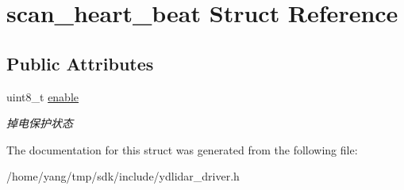 \hypertarget{structscan__heart__beat}{}\section{scan\+\_\+heart\+\_\+beat Struct Reference}
\label{structscan__heart__beat}
\subsection*{Public Attributes}
\begin{DoxyCompactItemize}
\item 
uint8\+\_\+t \hyperlink{structscan__heart__beat_a2b75f0058448601c590dda44d962d5c9}{enable}\hypertarget{structscan__heart__beat_a2b75f0058448601c590dda44d962d5c9}{}\label{structscan__heart__beat_a2b75f0058448601c590dda44d962d5c9}

\begin{DoxyCompactList}\small\item\em 掉电保护状态 \end{DoxyCompactList}\end{DoxyCompactItemize}


The documentation for this struct was generated from the following file\+:\begin{DoxyCompactItemize}
\item 
/home/yang/tmp/sdk/include/ydlidar\+\_\+driver.\+h\end{DoxyCompactItemize}
